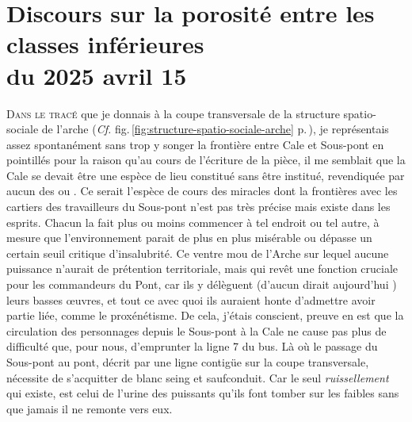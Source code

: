 \chapter[Discours sur la porosité entre les classes inférieures]{Discours sur la porosité entre les classes inférieures\\du 2025 avril 15}

\lettrine[lines=3]%
{D}{ans le tracé} que je donnais à la coupe transversale de la structure spatio-sociale de l’arche (\emph{Cf.} fig.\,\ref{fig:structure-spatio-sociale-arche} p.\,\pageref{fig:structure-spatio-sociale-arche}), je représentais assez spontanément sans trop y songer la frontière entre Cale et Sous-pont en pointillés pour la raison qu’au cours de l’écriture de la pièce, il me semblait que la Cale se devait être une espèce de lieu constitué sans être institué, revendiquée par aucun des \campprincipal{} ou \campoppose{}. Ce serait l’espèce de cours des miracles dont la frontières avec les cartiers des travailleurs du Sous-pont  n’est pas très précise mais existe dans les esprits. Chacun la fait plus ou moins commencer à tel endroit ou tel autre, à mesure que l’environnement parait de plus en plus misérable ou dépasse un certain seuil critique d’insalubrité. Ce ventre mou de l’Arche sur lequel aucune puissance n’aurait de prétention territoriale, mais qui revêt une fonction cruciale pour les commandeurs du Pont, car ils y délèguent (d’aucun dirait aujourd’hui ) leurs basses œuvres, et tout ce avec quoi ils auraient honte d’admettre avoir partie liée, comme le proxénétisme. De cela, j’étais conscient, preuve en est que la circulation des personnages depuis le Sous-pont à la Cale ne cause pas plus de difficulté que, pour nous, d’emprunter la ligne 7 du bus. Là où le passage du Sous-pont au pont, décrit par une ligne contigüe sur la coupe transversale, nécessite de s’acquitter de blanc seing et saufconduit. Car le seul \emph{ruissellement} qui existe, est celui de l’urine des puissants qu’ils font tomber sur les faibles sans que jamais il ne remonte vers eux.

